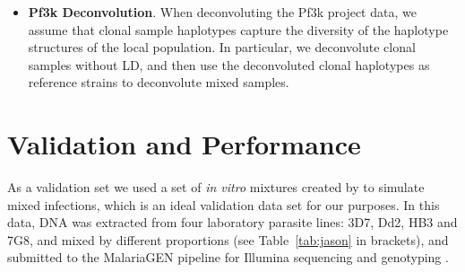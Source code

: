 \documentclass{bioinfo}
\begin{document}
\begin{itemize}
\item {\bf Pf3k Deconvolution}. When deconvoluting the Pf3k\citep{Pf3k2016} project data, we assume that clonal sample haplotypes capture the diversity of the haplotype structures of the local population. In particular, we deconvolute clonal samples without LD, and then use the deconvoluted clonal haplotypes as reference strains to deconvolute mixed samples.

\end{itemize}


\section{Validation and Performance}
As a validation set we used a set of {\it in vitro} mixtures created by \citet{Wendler2015} to simulate mixed infections, which is an ideal validation data set for our purposes. In this data, DNA was extracted from four laboratory parasite lines: 3D7, Dd2, HB3 and 7G8, and mixed by different proportions (see Table~\ref{tab:jason} in brackets), and submitted to the MalariaGEN pipeline \citep{MalariaGen2008} for Illumina sequencing and genotyping \citep{Menske2012}.
\end{document}
